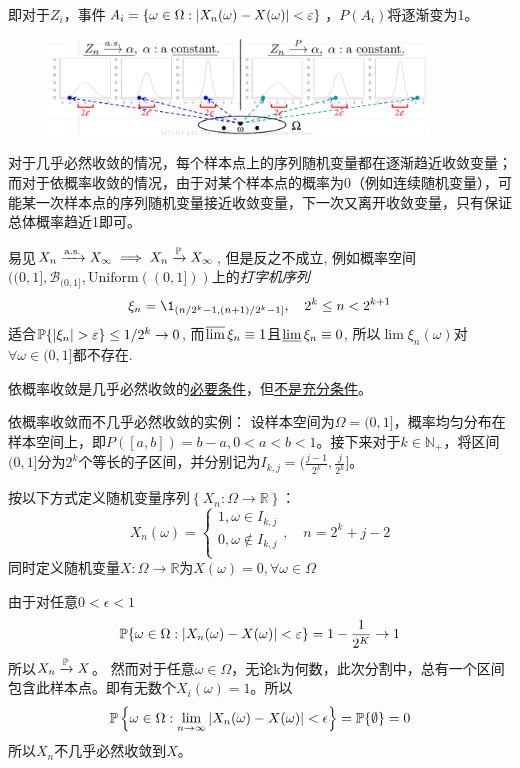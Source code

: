 \begin{remark}
    即对于$Z_i$，事件$A_i=\{\omega \in \Omega: \abs{X_n(\omega) - X(\omega)}<\e\}$，$P(A_i)$将逐渐变为1。
\end{remark}

\begin{figure}[h]
    \centering
    \includegraphics[width=0.9\textwidth]{image/converge1.png}
\end{figure}

\begin{remark}
    对于几乎必然收敛的情况，每个样本点上的序列随机变量都在逐渐趋近收敛变量；而对于依概率收敛的情况，由于对某个样本点的概率为0（例如连续随机变量），可能某一次样本点的序列随机变量接近收敛变量，下一次又离开收敛变量，只有保证总体概率趋近1即可。
\end{remark}

易见$X_{n} \xrightarrow{\as} X_{\infty} \implies X_{n} \xrightarrow{\P} X_{\infty}$, 但是反之不成立, 例如概率空间$((0,1],\mathscr{B}_{(0,1]},\mathrm{Uniform}((0,1]))$上的\emph{打字机序列}
\[ \xi_{n} = \1_{(n/2^{k}-1,(n+1)/2^{k}-1]}, \quad 2^{k} \le n < 2^{k+1} \]
适合$\P\{\abs{\xi_{n}}>\e\} \le 1/2^{k} \to 0$, 而$\varlimsup \xi_{n} \equiv 1$且$\varliminf \xi_{n} \equiv 0$, 所以$\lim \xi_{n}(\omega)$对$\forall \omega \in (0,1]$都不存在.

\begin{proposition}
    依概率收敛是几乎必然收敛的\underline{必要条件}，但\underline{不是充分条件}。
\end{proposition}

\begin{example}
    依概率收敛而不几乎必然收敛的实例：
    设样本空间为$\Omega = (0,1]$，概率均匀分布在样本空间上，即$P([a,b])=b-a,0<a<b<1$。接下来对于$k \in \mathbb{N}_+$，将区间$(0,1]$分为$2^{k}$个等长的子区间，并分别记为$I_{k,j}=(\frac{j-1}{2^k},\frac{j}{2^k}]$。

    按以下方式定义随机变量序列$\left\{ X_n: \Omega \to \mathbb{R} \right\}$：
    \[ X_n(\omega)=\begin{cases}
            1, \omega \in I_{k,j}    \\
            0, \omega \notin I_{k,j} \\
        \end{cases} ,\quad n = 2^k+j-2\]
    同时定义随机变量$X: \Omega \to \mathbb{R}$为$X(\omega)=0,\forall \omega \in \Omega$

    由于对任意$0<\epsilon<1$ 
    \[ \P\{\omega \in \Omega: \abs{X_n(\omega) - X(\omega)}<\e\}=1-\frac{1}{2^K} \to 1  \]
    所以$X_{n} \xrightarrow{\P} X$。
    然而对于任意$\omega \in \Omega$，无论k为何数，此次分割中，总有一个区间包含此样本点。即有无数个$X_i(\omega) = 1$。所以
    \[ \P\left\{ \omega \in \Omega: \lim_{n \to \infty}\abs{ X_n(\omega) - X(\omega)} < \epsilon \right\} =\P\{\emptyset \}=0 \]
    所以$X_{n}$不几乎必然收敛到$X$。
\end{example}

